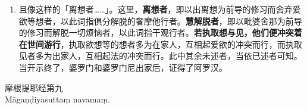 \begin{enumerate}\item 且像这样的「离想者……」。这里，\textbf{离想者}，即以出离想为前导的修习而舍弃爱欲等想者，以此词指俱分解脱的奢摩他行者。\textbf{慧解脱者}，即以毗婆舍那为前导的修习而解脱一切烦恼者，以此词指干观行者。\textbf{若执取想与见，他们便冲突着在世间游行}，执取欲想等的想者多为在家人，互相起爱欲的冲突而行，而执取见者多为出家人，互相起法的冲突而行。此中其余未述者，当依已述者可知。当开示终了，婆罗门和婆罗门尼出家后，证得了阿罗汉。\end{enumerate}

\begin{center}\vspace{1em}摩根提耶经第九\\Māgaṇḍiyasuttaṃ navamaṃ.\end{center}